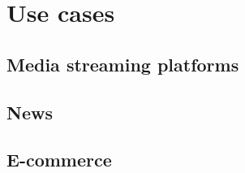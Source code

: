 \section{Use cases}\label{sec:usecases} %

\subsection{Media streaming platforms} %

\subsection{News} %

\subsection{E-commerce} %
